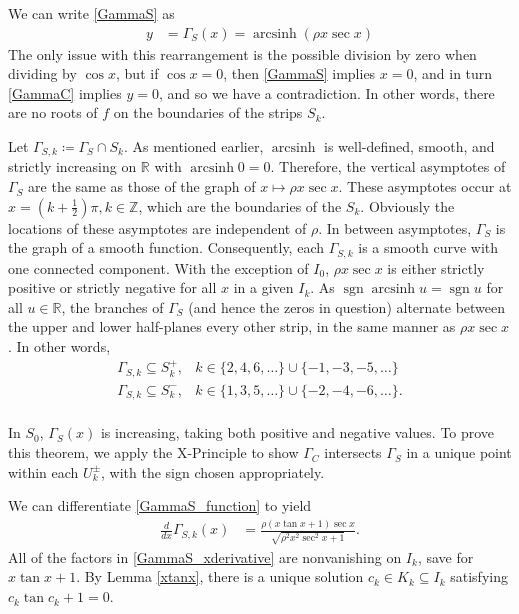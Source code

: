 \documentclass{amsart}
\theoremstyle{plain}
\numberwithin{theorem}{section}
\DeclareMathOperator{\arcsinh}{arcsinh}
\DeclareMathOperator{\sgn}{sgn}
\theoremstyle{definition}
\theoremstyle{remark}
\theoremstyle{brakets}
\newcommand{\R}{\mathbb{R}}
\newcommand{\Z}{\mathbb{Z}}
\begin{document}
We can write \eqref{GammaS} as 
\begin{align}
\label{GammaS_function}
    y &= \Gamma_S(x) = \arcsinh(\rho x \sec x)
\end{align}
The only issue with this rearrangement is the possible division by zero when dividing by $\cos x$, but if $\cos x = 0$, then \eqref{GammaS} implies $x = 0$, and in turn \eqref{GammaC} implies $y = 0$, and so we have a contradiction. In other words, there are no roots of $f$ on the boundaries of the strips $S_k$.

Let $\Gamma_{S,k} \coloneq \Gamma_S \cap S_k$. As mentioned earlier, $\arcsinh$ is well-defined, smooth, and strictly increasing on $\R$ with $\arcsinh 0 = 0$. Therefore, the vertical asymptotes of $\Gamma_S$ are the same as those of the graph of $x \mapsto \rho x \sec x$. These asymptotes occur at $x = (k + \frac{1}{2})\pi, k \in \Z$, which are the boundaries of the $S_k$.  Obviously the locations of these asymptotes are independent of $\rho$. In between asymptotes, $\Gamma_S$ is the graph of a smooth function. Consequently, each $\Gamma_{S,k}$ is a smooth curve with one connected component. With the exception of $I_0$, $\rho x \sec x$ is either strictly positive or strictly negative for all $x$ in a given $I_k$.  As $\sgn \arcsinh u = \sgn u$ for all $u \in \R$, the branches of $\Gamma_S$ (and hence the zeros in question) alternate between the upper and lower half-planes every other strip, in the same manner as $\rho x \sec x$. In other words,
\[
\begin{array}{ll}
    \Gamma_{S,k} \subseteq S_k^+, &  k \in \{2,4,6,\dots\} \cup \{-1,-3,-5,\dots\}  \\
    \Gamma_{S,k} \subseteq S_k^-, &  k \in \{1,3,5,\dots\} \cup \{-2,-4,-6,\dots\}. \\
\end{array} 
\]

In $S_0$, $\Gamma_S(x)$ is increasing, taking both positive and negative values. To prove this theorem, we apply the X-Principle to show $\Gamma_C$ intersects $\Gamma_S$ in a unique point within each $U^{\pm}_k$, with the sign chosen appropriately. 

We can differentiate \eqref{GammaS_function} to yield
\begin{align}
\label{GammaS_xderivative}
    \frac{d}{dx} \Gamma_{S,k}(x) &= \frac{\rho(x \tan x + 1)\sec x}{\sqrt{\rho^2x^2\sec^2 x + 1}}.
\end{align}
All of the factors in \eqref{GammaS_xderivative} are nonvanishing on $I_k$, save for $x\tan x + 1$. By Lemma \ref{xtanx}, there is a unique solution $c_k \in K_k \subseteq I_k$ satisfying $c_k \tan c_k + 1 = 0$. 
\end{document}
